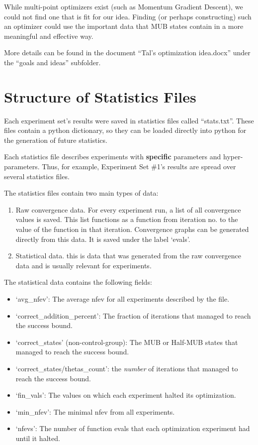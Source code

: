 \documentclass[a4paper,12pt]{article}
\newenvironment{denseitemize}%
  {\begin{itemize}%
    \setlength{\itemsep}{0pt}}%
  {\end{itemize}}
\begin{document}
While multi-point optimizers exist (such as Momentum Gradient Descent), we could not find one that is fit for our idea.
Finding (or perhaps constructing) such an optimizer could use the important data that MUB states contain in a more meaningful and effective way.


More details can be found in the document ``Tal's optimization idea.docx'' under the ``goals and ideas'' subfolder.



\printbibliography

\appendix

\section{Structure of Statistics Files}
Each experiment set's results were saved in statistics files called ``stats.txt''.
These files contain a python dictionary, so they can be loaded directly into python for the generation of future statistics.

Each statistics file describes experiments with \textbf{specific} parameters and hyper-parameters.
Thus, for example, Experiment Set \#1's results are spread over several statistics files.

The statistics files contain two main types of data:
\begin{enumerate}
    \item Raw convergence data. For every experiment run, a list of all convergence values is saved.
    This list functions as a function from iteration no. to the value of the function in that iteration.
    Convergence graphs can be generated directly from this data.
    It is saved under the label `evals'.
    \item Statistical data. this is data that was generated from the raw convergence data and is usually relevant for experiments.
\end{enumerate}

The statistical data contains the following fields:
\begin{denseitemize}
    \item `avg\_nfev': The average nfev for all experiments described by the file.
    \item `correct\_addition\_percent': The fraction of iterations that managed to reach the success bound.
    \item `correct\_states' (non-control-group): The MUB or Half-MUB states that managed to reach the success bound.
    \item `correct\_states/thetas\_count': the \emph{number} of iterations that managed to reach the success bound.
    \item `fin\_vals': The values on which each experiment halted its optimization.
    \item `min\_nfev': The minimal nfev from all experiments.
    \item `nfevs': The number of function evals that each optimization experiment had until it halted.
\end{denseitemize}
\end{document}
